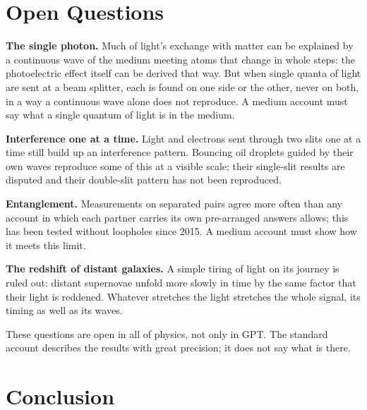 \section{Open Questions}

\begin{openbar}
\textbf{The single photon.} Much of light's exchange with matter can be explained by a continuous wave of the medium meeting atoms that change in whole steps: the photoelectric effect itself can be derived that way.\footnotemark{} But when single quanta of light are sent at a beam splitter, each is found on one side or the other, never on both, in a way a continuous wave alone does not reproduce.\footnotemark{} A medium account must say what a single quantum of light is in the medium.

\textbf{Interference one at a time.} Light and electrons sent through two slits one at a time still build up an interference pattern. Bouncing oil droplets guided by their own waves reproduce some of this at a visible scale; their single-slit results are disputed and their double-slit pattern has not been reproduced.\footnotemark{}

\textbf{Entanglement.} Measurements on separated pairs agree more often than any account in which each partner carries its own pre-arranged answers allows; this has been tested without loopholes since 2015.\footnotemark{} A medium account must show how it meets this limit.

\textbf{The redshift of distant galaxies.} A simple tiring of light on its journey is ruled out: distant supernovae unfold more slowly in time by the same factor that their light is reddened.\footnotemark{} Whatever stretches the light stretches the whole signal, its timing as well as its waves.
\end{openbar}
\addtocounter{footnote}{-4}

These questions are open in all of physics, not only in GPT. The standard account describes the results with great precision; it does not say what is there.

\section*{Conclusion}

